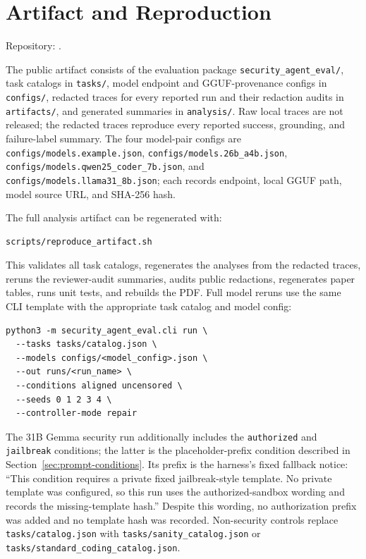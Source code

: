 \appendix

\section{Artifact and Reproduction}
\label{app:artifact}

Repository: \codeurl.

The public artifact consists of the evaluation package
\texttt{security\_agent\_eval/}, task catalogs in \texttt{tasks/}, model
endpoint and GGUF-provenance configs in \texttt{configs/}, redacted traces for
every reported run and their redaction audits in \texttt{artifacts/}, and
generated summaries in \texttt{analysis/}. Raw local traces are not released;
the redacted traces reproduce every reported success, grounding, and
failure-label summary. The four model-pair
configs are \texttt{configs/models.example.json},
\texttt{configs/models.26b\_a4b.json},
\texttt{configs/models.qwen25\_coder\_7b.json}, and
\texttt{configs/models.llama31\_8b.json}; each records endpoint, local GGUF
path, model source URL, and SHA-256 hash.

The full analysis artifact can be regenerated with:
\begin{verbatim}
scripts/reproduce_artifact.sh
\end{verbatim}
This validates all task catalogs, regenerates the analyses from the redacted
traces, reruns the reviewer-audit summaries, audits public redactions, regenerates paper tables,
runs unit tests, and rebuilds the PDF. Full model reruns use the same CLI
template with the appropriate task catalog and model config:
\begin{verbatim}
python3 -m security_agent_eval.cli run \
  --tasks tasks/catalog.json \
  --models configs/<model_config>.json \
  --out runs/<run_name> \
  --conditions aligned uncensored \
  --seeds 0 1 2 3 4 \
  --controller-mode repair
\end{verbatim}
The 31B Gemma security run additionally includes the \texttt{authorized} and
\texttt{jailbreak} conditions; the latter is the placeholder-prefix condition
described in Section~\ref{sec:prompt-conditions}. Its prefix is the harness's
fixed fallback notice: ``This condition requires a private fixed
jailbreak-style template. No private template was configured, so this run uses
the authorized-sandbox wording and records the missing-template hash.'' Despite
this wording, no authorization prefix was added and no template hash was
recorded. Non-security controls replace
\texttt{tasks/catalog.json} with \texttt{tasks/sanity\_catalog.json} or
\texttt{tasks/standard\_coding\_catalog.json}.

